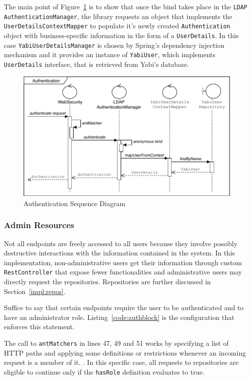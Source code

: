 The main point of Figure~\ref{fig:authseq} is to show that once the bind takes place in the \texttt{LDAP AuthenticationManager}, the library requests an object that implements the \texttt{UserDetailsContextMapper} to populate it's newly created \texttt{Authentication} object with business-specific information in the form of a \texttt{UserDetails}. In this case \texttt{YabiUserDetailsManager} is chosen by Spring's dependency injection mechanism and it provides an instance of \texttt{YabiUser}, which implements \texttt{UserDetails} interface, that is retrieved from \gls{Yabi}'s database.

\begin{figure}
  \centering
  \includegraphics[width=.9\textwidth]{images/diagramas/authentication}
  \caption{Authentication Sequence Diagram}\label{fig:authseq}
\end{figure}


\subsubsection{Admin Resources}\label{impl:admres}
Not all endpoints are freely accessed to all users because they involve possibly destructive interactions with the information contained in the system. In this implementation, non-administrative users get their information through custom \texttt{RestController} that expose fewer functionalities and administrative users may directly request the repositories. Repositories are further discussed in Section~\ref{impl:repos}.

Suffice to say that certain endpoints require the user to be authenticated and to have an administrator role. Listing~\ref{code:authblock} is the configuration that enforces this statement.

The call to \texttt{antMatchers} in lines 47, 49 and 51 works by specifying a list of \gls{HTTP} paths and applying some definitions or restrictions whenever an incoming request is a member of it. . In this specific case, all requests to repositories are eligible to continue only if the \texttt{hasRole} definition evaluates to true.

